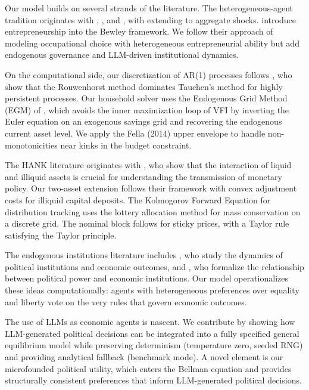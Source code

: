 \documentclass[12pt]{article}
\begin{document}
Our model builds on several strands of the literature. The heterogeneous-agent tradition originates with \citet{bewley1977}, \citet{huggett1993}, and \citet{aiyagari1994}, with \citet{krusellsmith1998} extending to aggregate shocks. \citet{cagettideNardi2006} introduce entrepreneurship into the Bewley framework. We follow their approach of modeling occupational choice with heterogeneous entrepreneurial ability but add endogenous governance and LLM-driven institutional dynamics.

On the computational side, our discretization of AR(1) processes follows \citet{kopeckysuen2010}, who show that the Rouwenhorst method dominates Tauchen's method for highly persistent processes. Our household solver uses the Endogenous Grid Method (EGM) of \citet{carroll2006}, which avoids the inner maximization loop of VFI by inverting the Euler equation on an exogenous savings grid and recovering the endogenous current asset level. We apply the Fella (2014) upper envelope to handle non-monotonicities near kinks in the budget constraint.

The HANK literature originates with \citet{kaplanmollviolante2018}, who show that the interaction of liquid and illiquid assets is crucial for understanding the transmission of monetary policy. Our two-asset extension follows their framework with convex adjustment costs for illiquid capital deposits. The Kolmogorov Forward Equation for distribution tracking uses the \citet{young2010} lottery allocation method for mass conservation on a discrete grid. The nominal block follows \citet{rotemberg1982} for sticky prices, with a Taylor rule satisfying the Taylor principle.

The endogenous institutions literature includes \citet{acemoglurobinson2006}, who study the dynamics of political institutions and economic outcomes, and \citet{acemoglu2005}, who formalize the relationship between political power and economic institutions. Our model operationalizes these ideas computationally: agents with heterogeneous preferences over equality and liberty vote on the very rules that govern economic outcomes.

The use of LLMs as economic agents is nascent. We contribute by showing how LLM-generated political decisions can be integrated into a fully specified general equilibrium model while preserving determinism (temperature zero, seeded RNG) and providing analytical fallback (benchmark mode). A novel element is our microfounded political utility, which enters the Bellman equation and provides structurally consistent preferences that inform LLM-generated political decisions.
\end{document}
